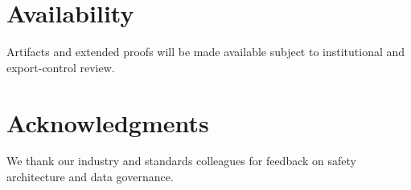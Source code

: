 \documentclass[letterpaper,twocolumn,10pt]{article}
\begin{document}
\section*{Availability}
Artifacts and extended proofs will be made available subject to institutional and export-control review.

\section*{Acknowledgments}
We thank our industry and standards colleagues for feedback on safety architecture and data governance.



\end{document}
